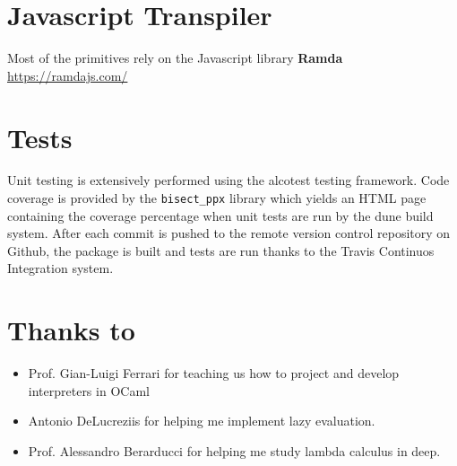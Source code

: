 \documentclass[a4paper, 11pt]{article}
\theoremstyle{plain}%
\theoremstyle{definition}
\theoremstyle{remark}
\begin{document}
\begin{multicols}{2}
\section{Javascript Transpiler}

Most of the primitives rely on the Javascript library \textbf{Ramda} \url{https://ramdajs.com/}

\section{Tests}
Unit testing is extensively performed using the alcotest testing framework. Code
coverage is provided by the \texttt{bisect\_ppx} library which yields an HTML
page containing the coverage percentage when unit tests are run by the dune
build system. After each commit is pushed to the remote version control repository on
Github, the package is built and tests are run thanks to the Travis Continuos
Integration system.

\section{Thanks to}

\begin{itemize}
	\item Prof. Gian-Luigi Ferrari for teaching us how to project and develop
	interpreters in OCaml
	\item Antonio DeLucreziis for helping me implement lazy evaluation.
	\item Prof. Alessandro Berarducci for helping me study lambda calculus in deep.
\end{itemize}

\end{multicols}
\end{document}
